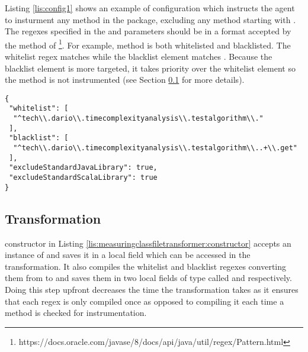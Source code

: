 \noindent Listing \ref{lis:config1} shows an example of configuration which instructs the agent to insturment any method in the  package, excluding any method starting with . The regexes specified in the  and  parameters should be in a format accepted by the  method of \footnote{https://docs.oracle.com/javase/8/docs/api/java/util/regex/Pattern.html}. For example, method  is both whitelisted and blacklisted. The whitelist regex matches  while the blacklist element matches . Because the blacklist element is more targeted, it takes priority over the whitelist element so the method is not instrumented (see Section \ref{sec:implementation:agent:transformation} for more details).

\begin{lstlisting}[breaklines,caption={Configuration JSON file example},label=lis:config1,style=json]
{
 "whitelist": [
  "^tech\\.dario\\.timecomplexityanalysis\\.testalgorithm\\."
 ],
 "blacklist": [
  "^tech\\.dario\\.timecomplexityanalysis\\.testalgorithm\\..+\\.get"
 ],
 "excludeStandardJavaLibrary": true,
 "excludeStandardScalaLibrary": true
}
\end{lstlisting}

\subsection{Transformation}
\label{sec:implementation:agent:transformation}

 constructor in Listing \ref{lis:measuringclassfiletransformer:constructor} accepts an instance of  and saves it in a local field which can be accessed in the transformation. It also compiles the whitelist and blacklist regexes converting them from  to  and saves them in two local fields of type  called  and  respectively. Doing this step upfront decreases the time the transformation takes as it ensures that each regex is only compiled once as opposed to compiling it each time a method is checked for instrumentation.

